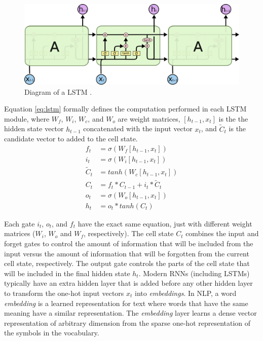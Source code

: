 \begin{figure}[!h]
\centering
\includegraphics[width=0.9\columnwidth]{imgs/background/lstm.png}
\caption{Diagram of a LSTM \cite{olah2015understanding}.}
\label{fig:lstm}
\end{figure}

Equation \ref{eq:lstm} formally defines the computation performed in each LSTM module, where $W_f$, $W_i$, $W_c$, and $W_o$ are weight matrices, $[h_{t-1}, x_t]$ is the the hidden state vector $h_{t-1}$ concatenated with the input vector $x_t$, and $\tilde{C}_t$ is the candidate vector to added to the cell state.
\begin{equation} \label{eq:lstm}
\begin{split}
    f_t &= \sigma(W_f[h_{t-1}, x_t]) \\
    i_t &= \sigma(W_i[h_{t-1}, x_t]) \\
    \tilde{C}_t &= tanh(W_c[h_{t-1},x_t]) \\
    C_t &= f_t * C_{t-1} + i_t * \tilde{C}_t \\
    o_t &= \sigma(W_o[h_{t-1}, x_t]) \\
    h_t &= o_t * tanh(C_t)
\end{split}
\end{equation}

Each gate $i_t$, $o_t$, and $f_t$ have the exact same equation, just with different weight matrices ($W_i$, $W_o$ and $W_f$, respectively). The cell state $C_t$ combines the input and forget gates to control the amount of information that will be included from the input versus the amount of information that will be forgotten from the current cell state, respectively. The output gate controls the parts of the cell state that will be included in the final hidden state $h_t$. Modern RNNs (including LSTMs) typically have an extra hidden layer that is added before any other hidden layer to transform the one-hot input vectors $x_t$ into \textit{embeddings}. In NLP, a word \textit{embedding} is a learned representation for text where words that have the same meaning have a similar representation. The \textit{embedding} layer learns a dense vector representation of arbitrary dimension from the sparse one-hot representation of the symbols in the vocabulary.

